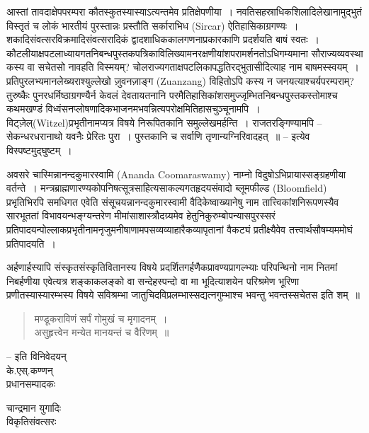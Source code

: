 आस्तां तावदाक्षेपपरम्परा कौतस्कुतस्यास्याऽत्यन्तमेव प्रतिक्षेपणीया~। नवतिसहस्राधिकशिलादिलेखानामुद्भुतं विस्तृतं च लोकं भारतीयं पुरस्तान्नः प्रस्तौति सर्काराभिध (Sircar) ऐतिहासिकाग्रगण्यः~। शकादिसंवत्सरविक्रमादिसंवत्सरादिकं द्वादशाधिककालगणनाप्रकारकाणि प्रदर्शयति बाषं स्वतः~। कौटलीयाक्षपटलाध्यायगतनिबन्धपुस्तकपत्रिकाविलिख्यामनरक्षणीयांशपरामर्शनतोऽधिगम्यमाना सौराज्यव्यवस्था कस्य वा सचेतसो नावहति विस्मयम्? चोलराज्यगताक्षपटलिकापद्धतिरद्भुतासीदित्याह नाम बाषमस्स्वयम्~। प्रतिपुरलभ्यमानलेख्यराश्युल्लेखो ज़ुवनज़ाङ्ग (Zuanzang) विहितोऽपि कस्य न जनयत्याश्चर्यपरम्पराम्? तुरुष्कैः पुनरधर्मिष्ठाग्रगण्यैर्न केवलं देवतायतनानि परमैतिहासिकांशसमुज्जृम्भितनिबन्धपुस्तकस्तोमाश्च कथमखण्डं विध्वंसनप्लोषणादिकभाजनमभवन्नित्यपरोक्षमितिहासचुञ्चूनामपि~। विट्ज़ेल्(Witzel)प्रभृतीनामप्यत्र विषये निरूपितकानि समुल्लेखमर्हन्ति~। राजतरङ्गिण्यामपि – सेकन्धरधरानाथो यवनैः प्रेरितः पुरा~। पुस्तकानि च सर्वाणि तृणान्यग्निरिवादहत्~॥ – इत्येव विस्पष्टमुद्घुष्टम्~।

अवसरे चास्मिन्नानन्दकुमारस्वामि (Ananda Coomaraswamy) नाम्नो विदुषोऽभिप्रायास्सङ्ग्रहणीया वर्तन्ते~। मन्त्रब्राह्मणारण्यकोपनिषत्सूत्रसाहित्यसाकल्यगतहृदयसंवादो ब्लूमफील्ड (Bloomfield) प्रभृतिभिरपि समधिगत एवेति संसूचयन्नानन्दकुमारस्वामी वैदिकेष्वाख्यानेषु नाम तात्त्विकांशनिरूपणस्यैव सारभूततां विभावयन्भङ्ग्यन्तरेण मीमांसाशास्त्रौदग्र्यमेव हेतुनिकुरुम्बोपन्यासपुरस्सरं प्रतिपादयन्पोल्लाकप्रभृतीनामनृजुमनीषाणामपसव्यव्याहारैकव्यापृतानां वैकट्यं प्रतीक्ष्यैवेव तत्त्वार्थसौषम्यममोघं प्रतिपादयति~।

अर्हणार्हस्यापि संस्कृतसंस्कृतिवितानस्य विषये प्रदर्शितगर्हणैकप्रावण्यप्रागल्भ्याः परिपन्थिनो नाम नितमां निबर्हणीया एवेत्यत्र शङ्काकलङ्को वा सन्देहस्पन्दो वा मा भूदित्याशयेन परिश्रमेण भूरिणा प्रणीतस्यास्यारम्भस्य विषये सविश्रम्भा जातुचिदविप्रलम्भास्सद्यत्नगुम्भाश्च भवन्तु भवन्तस्सचेतस इति शम्~॥

\begin{verse}
मण्डूकराविणं सर्पं गोमुखं च मृगादनम्~।\\ असुहृत्त्वेन मन्येत मानयन्तं च वैरिणम्~॥
\end{verse}

\begin{flushright}
– इति विनिवेदयन् \\ के.एस्.कण्णन्\\ प्रधानसम्पादकः
\end{flushright}

चान्द्रमान युगादिः \\ विकृतिसंवत्सरः

